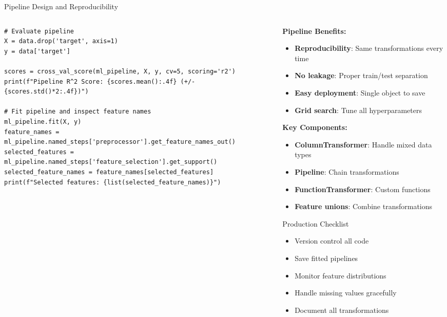 \documentclass[aspectratio=169,11pt]{beamer}
\begin{document}
\begin{frame}[fragile]{Pipeline Design and Reproducibility}
\begin{columns}
\begin{column}{0.6\textwidth}
\begin{lstlisting}
# Evaluate pipeline
X = data.drop('target', axis=1)
y = data['target']

scores = cross_val_score(ml_pipeline, X, y, cv=5, scoring='r2')
print(f"Pipeline R^2 Score: {scores.mean():.4f} (+/- {scores.std()*2:.4f})")

# Fit pipeline and inspect feature names
ml_pipeline.fit(X, y)
feature_names = ml_pipeline.named_steps['preprocessor'].get_feature_names_out()
selected_features = ml_pipeline.named_steps['feature_selection'].get_support()
selected_feature_names = feature_names[selected_features]
print(f"Selected features: {list(selected_feature_names)}")
\end{lstlisting}
\end{column}
\begin{column}{0.4\textwidth}
\textbf{Pipeline Benefits:}

\begin{itemize}
\item \textcolor{forest}{\textbf{Reproducibility}}: Same transformations every time
\item \textcolor{forest}{\textbf{No leakage}}: Proper train/test separation
\item \textcolor{forest}{\textbf{Easy deployment}}: Single object to save
\item \textcolor{forest}{\textbf{Grid search}}: Tune all hyperparameters
\end{itemize}

\vspace{0.3cm}
\textbf{Key Components:}
\begin{itemize}
\item \textbf{ColumnTransformer}: Handle mixed data types
\item \textbf{Pipeline}: Chain transformations
\item \textbf{FunctionTransformer}: Custom functions
\item \textbf{Feature unions}: Combine transformations
\end{itemize}

\vspace{0.3cm}
\begin{block}{Production Checklist}
\begin{itemize}
\item Version control all code
\item Save fitted pipelines
\item Monitor feature distributions
\item Handle missing values gracefully
\item Document all transformations
\end{itemize}
\end{block}
\end{column}
\end{columns}
\end{frame}
\end{document}
